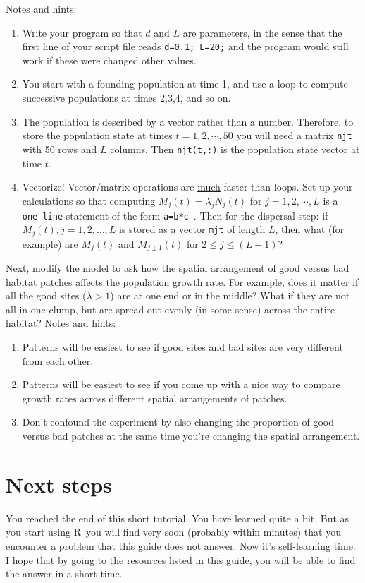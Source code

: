 \documentclass [11pt]{article}
\newcommand{\ttt}[1]{{\tt #1}}
\newcommand\R{{\sf R}}
\numberwithin{exercise}{section}
\begin{document}
Notes and hints:
\begin{enumerate}
\item Write your program so that $d$ and $L$ are parameters, 
in the sense that the first line of your script file reads \texttt{d=0.1; L=20;} 
and the program would still work if these were changed other values. 
\item You start with a founding population at time 1, and use a loop
to compute successive populations at times 2,3,4, and so on. 
\item The population is described by a vector rather than a number. Therefore,
to store the population state at times $t=1,2,\cdots,50$ you will need
a matrix \ttt{njt} with 50 rows and $L$ columns. Then \ttt{njt(t,:)} is the population 
state vector at time $t$. 
\item Vectorize! Vector/matrix operations are \underline{much}  
faster than loops. Set up your calculations so that computing $M_j(t) = 
\lambda_j N_j(t)$ for $j=1,2,\cdots,L$ is a \texttt{one-line} statement of the form \texttt{a=b*c }. 
Then for the dispersal step: if $M_j(t), j=1,2,\ldots,L$ is stored as a vector \ttt{mjt} of length
$L$, then what (for example) are $M_j(t)$ and $M_{j \pm 1}(t)$ for $2 \le j \le (L-1)$? 
\end{enumerate}

Next, modify the model to ask how the spatial arrangement of good versus bad habitat patches affects the  
population growth rate. For example, does it matter if all the good sites 
($\lambda >1$) are at one end or in the middle? What if they are not all in 
one clump, but are spread out evenly (in some sense) across the entire 
habitat? 
Notes and hints:
\begin{enumerate}
\item Patterns will be easiest to see if 
good sites and bad sites are very different from each other. 
\item Patterns will be easiest to see if you come up with a nice way to compare growth 
rates across different spatial arrangements of patches. 
\item Don't confound the experiment by also changing the proportion of good versus bad patches at
the same time you're changing the spatial arrangement. 
\end{enumerate}

\section{Next steps}
You reached the end of this short tutorial. You have learned quite a bit. But as you start using \R\, you will find very soon (probably within minutes) that you encounter a problem that this guide does not answer. Now it's self-learning time. I hope that by going to the resources listed in this guide, you will be able to find the answer in a short time. 
\end{document}
